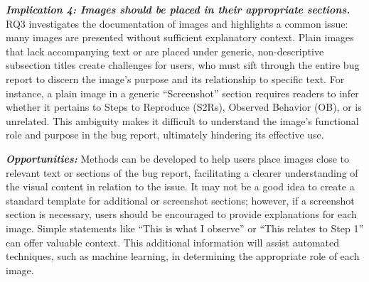 \noindent
\textbf{\emph{Implication 4: Images should be placed in their appropriate sections.}}
RQ3 investigates the documentation of images and highlights a common issue: many images are presented without sufficient explanatory context. Plain images that lack accompanying text or are placed under generic, non-descriptive subsection titles create challenges for users, who must sift through the entire bug report to discern the image's purpose and its relationship to specific text. For instance, a plain image in a generic “Screenshot” section requires readers to infer whether it pertains to Steps to Reproduce (S2Rs), Observed Behavior (OB), or is unrelated. This ambiguity makes it difficult to understand the image's functional role and purpose in the bug report, ultimately hindering its effective use.


\textbf{\textit{Opportunities:}} Methods can be developed to help users place images close to relevant text or sections of the bug report, facilitating a clearer understanding of the visual content in relation to the issue. It may not be a good idea to create a standard template for additional or screenshot sections; however, if a screenshot section is necessary, users should be encouraged to provide explanations for each image. Simple statements like “This is what I observe” or “This relates to Step 1” can offer valuable context. This additional information will assist automated techniques, such as machine learning, in determining the appropriate role of each image.

